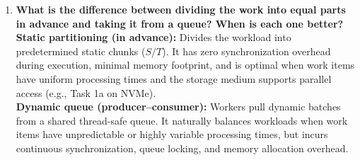 \documentclass{labreport}
\begin{document}
\begin{enumerate}
    \item \textbf{What is the difference between dividing the work into equal parts in advance and taking it from a queue? When is each one better?}\\
    \textbf{Static partitioning (in advance):} Divides the workload into predetermined static chunks ($S/T$). It has zero synchronization overhead during execution, minimal memory footprint, and is optimal when work items have uniform processing times and the storage medium supports parallel access (e.g., Task 1a on NVMe).\\
    \textbf{Dynamic queue (producer--consumer):} Workers pull dynamic batches from a shared thread-safe queue. It naturally balances workloads when work items have unpredictable or highly variable processing times, but incurs continuous synchronization, queue locking, and memory allocation overhead.
\end{enumerate}
\end{document}
